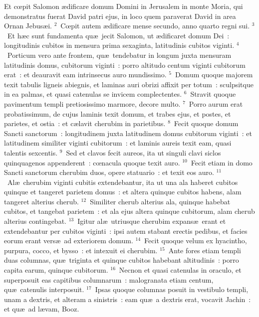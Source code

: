 \lettrine[lines=10,image=true,loversize=0.05,lraise=-0.03]{E}{}t cœpit Salomon \ae dificare domum Domini in Jerusalem in monte Moria, qui demonstratus fuerat David patri ejus, in loco quem paraverat David in area Ornan Jebus\ae i.
${}^{2}$~Cœpit autem \ae dificare mense secundo, anno quarto regni sui.
${}^{3}$~Et h\ae c sunt fundamenta qu\ae\ jecit Salomon, ut \ae dificaret domum Dei~: longitudinis cubitos in mensura prima sexaginta, latitudinis cubitos viginti.
${}^{4}$~Porticum vero ante frontem, qu\ae\ tendebatur in longum juxta mensuram latitudinis domus, cubitorum viginti~: porro altitudo centum viginti cubitorum erat~: et deauravit eam intrinsecus auro mundissimo.
${}^{5}$~Domum quoque majorem texit tabulis ligneis abiegnis, et laminas auri obrizi affixit per totum~: sculpsitque in ea palmas, et quasi catenulas se invicem complectentes.
${}^{6}$~Stravit quoque pavimentum templi pretiosissimo marmore, decore multo.
${}^{7}$~Porro aurum erat probatissimum, de cujus laminis texit domum, et trabes ejus, et postes, et parietes, et ostia~: et c\ae lavit cherubim in parietibus.
${}^{8}$~Fecit quoque domum Sancti sanctorum~: longitudinem juxta latitudinem domus cubitorum viginti~: et latitudinem similiter viginti cubitorum~: et laminis aureis texit eam, quasi talentis sexcentis.
${}^{9}$~Sed et clavos fecit aureos, ita ut singuli clavi siclos quinquagenos appenderent~: cœnacula quoque texit auro.
${}^{10}$~Fecit etiam in domo Sancti sanctorum cherubim duos, opere statuario~: et texit eos auro.
${}^{11}$~Al\ae\ cherubim viginti cubitis extendebantur, ita ut una ala haberet cubitos quinque et tangeret parietem domus~: et altera quinque cubitos habens, alam tangeret alterius cherub.
${}^{12}$~Similiter cherub alterius ala, quinque habebat cubitos, et tangebat parietem~: et ala ejus altera quinque cubitorum, alam cherub alterius contingebat.
${}^{13}$~Igitur al\ae\ utriusque cherubim expans\ae\ erant et extendebantur per cubitos viginti~: ipsi autem stabant erectis pedibus, et facies eorum erant vers\ae\ ad exteriorem domum.
${}^{14}$~Fecit quoque velum ex hyacintho, purpura, cocco, et bysso~: et intexuit ei cherubim.
${}^{15}$~Ante fores etiam templi duas columnas, qu\ae\ triginta et quinque cubitos habebant altitudinis~: porro capita earum, quinque cubitorum.
${}^{16}$~Necnon et quasi catenulas in oraculo, et superposuit eas capitibus columnarum~: malogranata etiam centum, qu\ae\ catenulis interposuit.
${}^{17}$~Ipsas quoque columnas posuit in vestibulo templi, unam a dextris, et alteram a sinistris~: eam qu\ae\ a dextris erat, vocavit Jachin~: et qu\ae\ ad l\ae vam, Booz.

